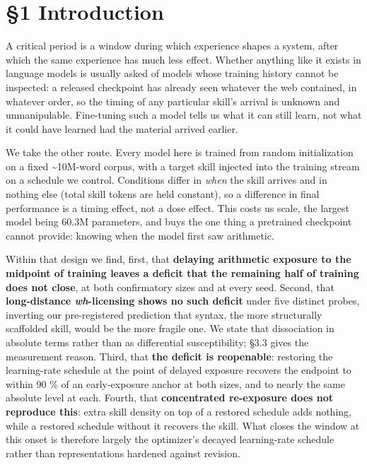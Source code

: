 \documentclass[11pt]{article}
\begin{document}
\section{§1 Introduction}\label{introduction}

A critical period is a window during which experience shapes a system, after which the same
experience has much less effect. Whether anything like it exists in language models is
usually asked of models whose training history cannot be inspected: a released checkpoint
has already seen whatever the web contained, in whatever order, so the timing of any
particular skill's arrival is unknown and unmanipulable. Fine-tuning such a model tells us
what it can still learn, not what it could have learned had the material arrived earlier.

We take the other route. Every model here is trained from random initialization on a fixed
\textasciitilde10M-word corpus, with a target skill injected into the training stream on a schedule we
control. Conditions differ in \emph{when} the skill arrives and in nothing else (total skill
tokens are held constant), so a difference in final performance is a timing effect, not a
dose effect. This costs us scale, the largest model being 60.3M parameters, and buys the one
thing a pretrained checkpoint cannot provide: knowing when the model first saw arithmetic.

Within that design we find, first, that \textbf{delaying arithmetic exposure to the midpoint of
training leaves a deficit that the remaining half of training does not close}, at both
confirmatory sizes and at every seed. Second, that \textbf{long-distance \emph{wh}-licensing shows no
such deficit} under five distinct probes, inverting our pre-registered prediction that
syntax, the more structurally scaffolded skill, would be the more fragile one. We state that
dissociation in absolute terms rather than as differential susceptibility; §3.3 gives the
measurement reason. Third, that \textbf{the deficit is reopenable}: restoring the learning-rate
schedule at the point of delayed exposure recovers the endpoint to within 90 \% of an
early-exposure anchor at both sizes, and to nearly the same absolute level at each. Fourth,
that \textbf{concentrated re-exposure does not reproduce this}: extra skill density on top of a
restored schedule adds nothing, while a restored schedule without it recovers the skill.
What closes the window at this onset is therefore largely the optimizer's decayed
learning-rate schedule rather than representations hardened against revision.
\end{document}
